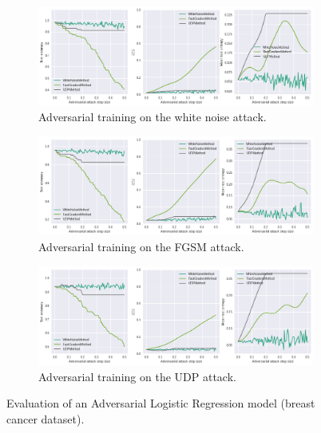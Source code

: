 \begin{figure}[!htbp]
    \begin{subfigure}{\textwidth}
      \centering
      \includegraphics[width=\linewidth]{figures/eval/eval_adv_uq_train_noise.png}
      \caption{Adversarial training on the white noise attack.}
    \end{subfigure}
     \begin{subfigure}{\textwidth}
      \centering
      \includegraphics[width=\linewidth]{figures/eval/eval_adv_uq_train_fgsm.png}
      \caption{Adversarial training on the FGSM attack.}
    \end{subfigure}
     \begin{subfigure}{\textwidth}
      \centering
      \includegraphics[width=\linewidth]{figures/eval/eval_adv_uq_train_udp.png}
      \caption{Adversarial training on the UDP attack.}
    \end{subfigure}
    \caption{Evaluation of an Adversarial Logistic Regression model (breast cancer dataset).}
    \label{fig:adversarial-evaluation-training}
\end{figure}

